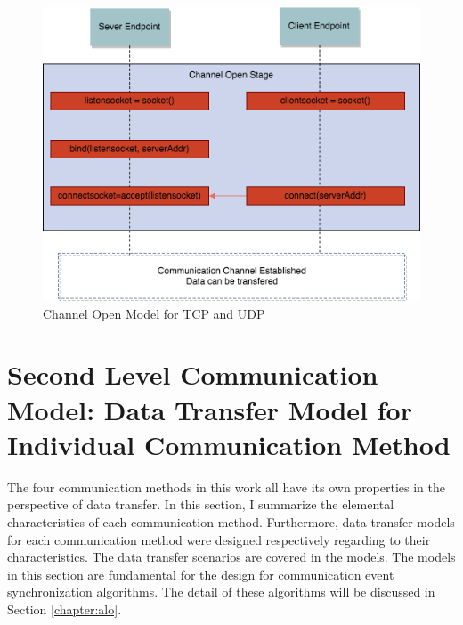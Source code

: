 \begin{figure}[H]
\centerline{\includegraphics[scale=0.55]{Figures/channelopen2}}
 \caption{Channel Open Model for TCP and UDP}
\label{channelopen2}
\end{figure}

\section{Second Level Communication Model: Data Transfer Model for Individual Communication Method}
The four communication methods in this work all have its own properties in the perspective of data
transfer. In this section, I summarize the elemental characteristics of each communication method.
Furthermore, data transfer models for each communication method were designed respectively regarding to their characteristics. The data transfer scenarios are covered in the
models. The models in this section are fundamental for the design for communication event synchronization algorithms. The detail of these algorithms will be discussed in Section \ref{chapter:alo}.
